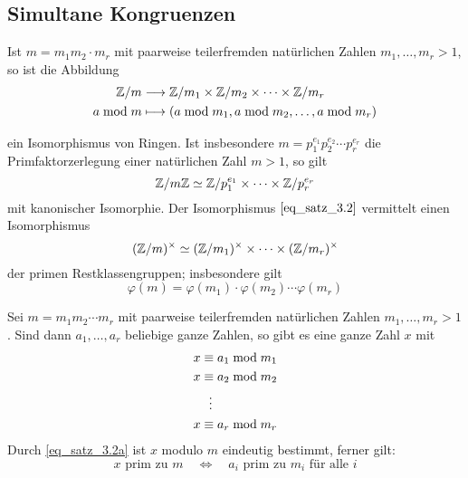 \subsection{Simultane Kongruenzen}
\begin{satz} \label{satz_3.2}
	Ist $m = m_1 m_2 \cdot m_r$ mit paarweise teilerfremden natürlichen Zahlen $m_1,\dots,m_r > 1$, so ist die Abbildung 
	\begin{equation}
	\begin{aligned}
		\mathbb{Z}/m &\longrightarrow \mathbb{Z}/m_1 \times \mathbb{Z}/m_2 \times \cdots \times \mathbb{Z}/m_r \\
		a \bmod m &\longmapsto (a \bmod m_1, a \bmod m_2, \dots, a \bmod m_r)	\label{eq_satz_3.2}
	\end{aligned}
	\end{equation}
	
	ein Isomorphismus von Ringen. Ist insbesondere $m = p_1^{e_1} p_2^{e_2} \cdots p_r^{e_r}$ die Primfaktorzerlegung einer natürlichen Zahl $m > 1$, so gilt
	\[ \mathbb{Z}/m\mathbb{Z} \simeq \mathbb{Z}/p_1^{e_1} \times \cdots \times \mathbb{Z}/p_r^{e_r} \]
	mit kanonischer Isomorphie. Der Isomorphismus $\eqref{eq_satz_3.2}$ vermittelt einen Isomorphismus
	\[ (\mathbb{Z}/m)^\times \simeq (\mathbb{Z}/m_1)^\times \times \dots \times (\mathbb{Z}/m_r)^\times \]
	der primen Restklassengruppen; insbesondere gilt
	\[ \varphi(m) = \varphi(m_1) \cdot \varphi(m_2) \cdots \varphi(m_r) \]
\end{satz}

\setcounter{satz}{1}
\begin{satz} \label{satz_3.2a}
	Sei $m = m_1m_2 \cdots m_r$ mit paarweise teilerfremden natürlichen Zahlen $m_1,\dots,m_r > 1$. Sind dann $a_1,\dots,a_r$ beliebige ganze Zahlen, so gibt es eine ganze Zahl $x$ mit  
	\begin{equation}
	\begin{aligned}
		x &\equiv a_1 \bmod m_1 \\
		x &\equiv a_2 \bmod m_2 \\
		&\ \ \vdots \\
		x &\equiv a_r \bmod m_r \label{eq_satz_3.2a}
	\end{aligned}
	\end{equation}
	Durch \eqref{eq_satz_3.2a} ist $x$ modulo $m$ eindeutig bestimmt, ferner gilt:
	\[ x \text{ prim zu } m \quad \Leftrightarrow \quad a_i \text{ prim zu } m_i \text{ für alle } i \]
\end{satz}

